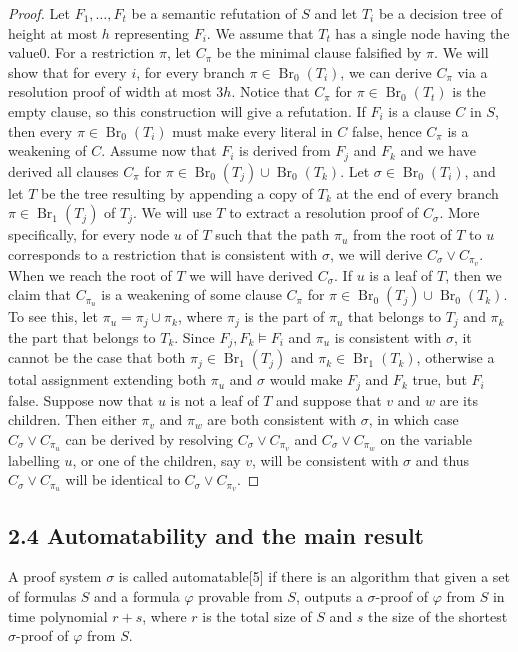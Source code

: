 \documentclass[10pt,a4paper]{article}
\newcommand{\Br}{\operatorname{Br}}
\begin{document}
\begin{proof}
Let $F_1,\ldots,F_t$ be a semantic refutation of $S$ and let $T_i$ be a decision tree of height at most $h$ representing $F_i$. We assume that $T_t$ has a single node having the value0. For a restriction $\pi$, let $C_\pi$ be the minimal clause falsified by $\pi$. We will show that for every $i$, for every branch $\pi\in\Br_0(T_i)$, we can derive $C_\pi$ via a resolution proof of width at most $3h$. Notice that $C_\pi$ for $\pi\in\Br_0(T_t)$ is the empty clause, so this construction will give a refutation.
If $F_i$ is a clause $C$ in $S$, then every $\pi\in\Br_0(T_i)$ must make every literal in $C$ false, hence $C_\pi$ is a weakening of $C$. Assume now that $F_i$ is derived from $F_j$ and $F_k$ and we have derived all clauses $C_\pi$ for $\pi\in\Br_0(T_j)\cup\Br_0(T_k)$. Let $\sigma\in\Br_0(T_i)$, and let $T$ be the tree resulting by appending a copy of $T_k$ at the end of every branch $\pi\in\Br_1(T_j)$ of $T_j$. We will use $T$ to extract a resolution proof of $C_\sigma$. More specifically, for every node $u$ of $T$ such that the path $\pi_u$ from the root of $T$ to $u$ corresponds to a restriction that is consistent with $\sigma$, we will derive $C_\sigma\vee C_{\pi_v}$. When we reach the root of $T$ we will have derived $C_\sigma$. If $u$ is a leaf of $T$, then we claim that $C_{\pi_u}$ is a weakening of some clause $C_\pi$ for $\pi\in\Br_0(T_j)\cup\Br_0(T_k)$. To see this, let $\pi_u=\pi_j\cup\pi_k$, where $\pi_j$ is the part of $\pi_u$ that belongs to $T_j$ and $\pi_k$ the part that belongs to $T_k$. Since $F_j,F_k\models F_i$ and $\pi_u$ is consistent with $\sigma$, it cannot be the case that both $\pi_j\in\Br_1(T_j)$ and $\pi_k\in\Br_1(T_k)$, otherwise a total assignment extending both $\pi_u$ and $\sigma$ would make $F_j$ and $F_k$ true, but $F_i$ false. Suppose now that $u$ is not a leaf of $T$ and suppose that $v$ and $w$ are its children. Then either $\pi_v$ and $\pi_w$ are both consistent with $\sigma$, in which case $C_\sigma\vee C_{\pi_u}$ can be derived by resolving $C_\sigma\vee C_{\pi_v}$ and $C_\sigma\vee C_{\pi_w}$ on the variable labelling $u$, or one of the children, say $v$, will be consistent with $\sigma$ and thus $C_\sigma\vee C_{\pi_u}$ will be identical to $C_\sigma\vee C_{\pi_v}$.
\end{proof}
\subsection*{2.4 Automatability and the main result}
A proof system $\sigma$ is called automatable[5] if there is an algorithm that given a set of formulas $S$ and a formula $\varphi$ provable from $S$, outputs a $\sigma$-proof of $\varphi$ from $S$ in time polynomial $r+s$, where $r$ is the total size of $S$ and $s$ the size of the shortest $\sigma$-proof of $\varphi$ from $S$.
\end{document}
